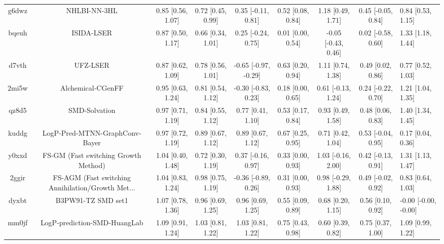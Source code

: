 \documentclass{article}
\begin{document}
\begin{center}
\begin{longtable}{|cccccccc|}
 g6dwz &                                       NHLBI-NN-3HL &  0.85 [0.56, 1.07] &  0.72 [0.45, 0.99] &    0.35 [-0.11, 0.81] &  0.52 [0.08, 0.84] &    1.18 [0.49, 1.71] &   0.45 [-0.05, 0.84] &     0.84 [0.53, 1.15] \\
 bqeuh &                                         ISIDA-LSER &  0.87 [0.50, 1.17] &  0.66 [0.34, 1.01] &    0.25 [-0.24, 0.75] &  0.01 [0.00, 0.54] &  -0.05 [-0.43, 0.46] &   0.02 [-0.58, 0.60] &     1.33 [1.18, 1.44] \\
 d7vth &                                           UFZ-LSER &  0.87 [0.62, 1.09] &  0.78 [0.56, 1.01] &  -0.65 [-0.97, -0.29] &  0.63 [0.20, 0.94] &    1.11 [0.74, 1.38] &    0.49 [0.02, 0.86] &     0.77 [0.52, 1.03] \\
 2mi5w &                                  Alchemical-CGenFF &  0.95 [0.63, 1.24] &  0.81 [0.54, 1.12] &   -0.30 [-0.83, 0.23] &  0.18 [0.00, 0.65] &   0.61 [-0.13, 1.24] &   0.24 [-0.22, 0.70] &     1.21 [1.04, 1.35] \\
 qz8d5 &                                      SMD-Solvation &  0.97 [0.71, 1.19] &  0.84 [0.55, 1.12] &     0.77 [0.41, 1.10] &  0.53 [0.17, 0.84] &    0.93 [0.49, 1.58] &    0.48 [0.06, 0.83] &     1.40 [1.34, 1.45] \\
 kuddg &                     LogP-Pred-MTNN-GraphConv-Bayer &  0.97 [0.72, 1.19] &  0.89 [0.67, 1.12] &     0.89 [0.67, 1.12] &  0.67 [0.25, 0.95] &    0.71 [0.42, 1.04] &   0.53 [-0.04, 0.95] &     0.17 [0.04, 0.36] \\
 y0xxd &               FS-GM (Fast switching Growth Method) &  1.04 [0.40, 1.48] &  0.72 [0.30, 1.19] &    0.37 [-0.16, 0.97] &  0.33 [0.00, 0.93] &   1.03 [-0.16, 2.00] &   0.42 [-0.13, 0.91] &     1.31 [1.13, 1.47] \\
 2ggir &  FS-AGM (Fast switching Annihilation/Growth Met... &  1.04 [0.83, 1.24] &  0.98 [0.75, 1.19] &   -0.36 [-0.89, 0.26] &  0.31 [0.00, 0.93] &   0.98 [-0.29, 1.88] &   0.49 [-0.02, 0.92] &     0.83 [0.64, 1.03] \\
 dyxbt &                                 B3PW91-TZ SMD set1 &  1.07 [0.78, 1.36] &  0.96 [0.69, 1.25] &     0.96 [0.69, 1.25] &  0.55 [0.09, 0.89] &    0.68 [0.20, 1.15] &    0.56 [0.10, 0.92] &  -0.00 [-0.00, -0.00] \\
 mm0jf &                       LogP-prediction-SMD-HuangLab &  1.09 [0.91, 1.24] &  1.03 [0.81, 1.22] &     1.03 [0.81, 1.22] &  0.75 [0.43, 0.98] &    0.60 [0.39, 0.82] &    0.75 [0.37, 1.00] &     1.09 [0.99, 1.22] \\

\end{longtable}
\end{center}
\end{document}
